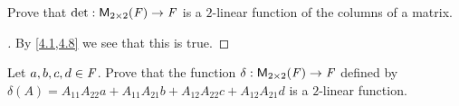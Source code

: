 \setcounter{ex}{12}
\begin{ex}\label{ex:4.5.13}
  Prove that \(\det : \ms[2][2][\F] \to \F\) is a \(2\)-linear function of the columns of a matrix.
\end{ex}

\begin{proof}[]
  By \cref{4.1,4.8} we see that this is true.
\end{proof}

\begin{ex}\label{ex:4.5.14}
  Let \(a, b, c, d \in \mathit{F}\).
  Prove that the function \(\delta : \ms[2][2][\F] \to \F\) defined by \(\delta(A) = A_{1 1} A_{2 2} a + A_{1 1} A_{2 1} b + A_{1 2} A_{2 2} c + A_{1 2} A_{2 1} d\) is a \(2\)-linear function.
\end{ex}


